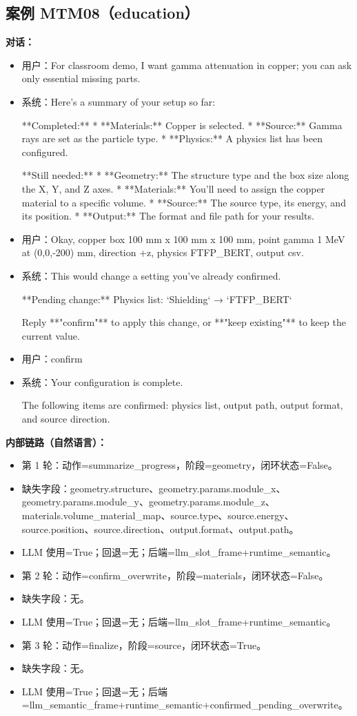 \documentclass[11pt]{ctexart}
\begin{document}
\subsection{案例 MTM08（education）}
\textbf{对话：}
\begin{itemize}
\item 用户：For classroom demo, I want gamma attenuation in copper; you can ask only essential missing parts.
\item 系统：Here's a summary of your setup so far:

**Completed:**
*   **Materials:** Copper is selected.
*   **Source:** Gamma rays are set as the particle type.
*   **Physics:** A physics list has been configured.

**Still needed:**
*   **Geometry:** The structure type and the box size along the X, Y, and Z axes.
*   **Materials:** You'll need to assign the copper material to a specific volume.
*   **Source:** The source type, its energy, and its position.
*   **Output:** The format and file path for your results.
\item 用户：Okay, copper box 100 mm x 100 mm x 100 mm, point gamma 1 MeV at (0,0,-200) mm, direction +z, physics FTFP\_BERT, output csv.
\item 系统：This would change a setting you've already confirmed.

**Pending change:**  
Physics list: `Shielding` → `FTFP\_BERT`

Reply **"confirm"** to apply this change, or **"keep existing"** to keep the current value.
\item 用户：confirm
\item 系统：Your configuration is complete.

The following items are confirmed: physics list, output path, output format, and source direction.
\end{itemize}
\textbf{内部链路（自然语言）：}
\begin{itemize}
\item 第 1 轮：动作=summarize\_progress，阶段=geometry，闭环状态=False。
\item 缺失字段：geometry.structure、geometry.params.module\_x、geometry.params.module\_y、geometry.params.module\_z、materials.volume\_material\_map、source.type、source.energy、source.position、source.direction、output.format、output.path。
\item LLM 使用=True；回退=无；后端=llm\_slot\_frame+runtime\_semantic。
\item 第 2 轮：动作=confirm\_overwrite，阶段=materials，闭环状态=False。
\item 缺失字段：无。
\item LLM 使用=True；回退=无；后端=llm\_slot\_frame+runtime\_semantic。
\item 第 3 轮：动作=finalize，阶段=source，闭环状态=True。
\item 缺失字段：无。
\item LLM 使用=True；回退=无；后端=llm\_semantic\_frame+runtime\_semantic+confirmed\_pending\_overwrite。
\end{itemize}
\end{document}
